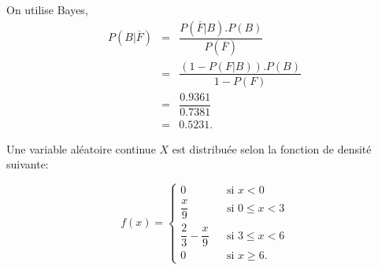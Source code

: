 \begin{questions}
\begin{parts}
\begin{solution}
On utilise Bayes,
    \begin{eqnarray*}
      P(B|\overline{F})     &=& \dfrac{P(\overline{F}|B).P(B)}{P(\overline{F})} \\
                            &=& \dfrac{(1-P(F|B)).P(B)}{1-P(F)} \\
                            &=& \dfrac{0.9361}{0.7381} \\
                            &=& 0.5231.
    \end{eqnarray*}
\end{solution}
\end{parts}


\newpage


\question\label{densite} 

Une variable aléatoire continue $X$ est distribuée selon la fonction de densité suivante:

$$f(x) = \left \{
\begin{array}{lcl}
    0               & &\text{si } x < 0 \\[0.5em]
    \dfrac{x}{9}              & &\text{si } 0 \leq x < 3   \\[1em]
    \dfrac{2}{3}-\dfrac{x}{9} & &\text{si } 3 \leq x < 6 \\[1em]
    0               & &\text{si } x \geq 6.
\end{array}
\right.$$

\end{questions}
